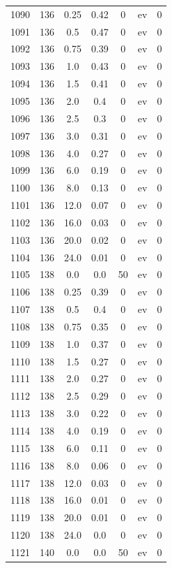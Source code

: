 \documentclass[12pt,a4paper]{article}
\begin{document}
\begin{tabular}{r|cccccc}
	1090 & 136 & 0.25 & 0.42 & 0 & ev & 0 \\
	1091 & 136 & 0.5 & 0.47 & 0 & ev & 0 \\
	1092 & 136 & 0.75 & 0.39 & 0 & ev & 0 \\
	1093 & 136 & 1.0 & 0.43 & 0 & ev & 0 \\
	1094 & 136 & 1.5 & 0.41 & 0 & ev & 0 \\
	1095 & 136 & 2.0 & 0.4 & 0 & ev & 0 \\
	1096 & 136 & 2.5 & 0.3 & 0 & ev & 0 \\
	1097 & 136 & 3.0 & 0.31 & 0 & ev & 0 \\
	1098 & 136 & 4.0 & 0.27 & 0 & ev & 0 \\
	1099 & 136 & 6.0 & 0.19 & 0 & ev & 0 \\
	1100 & 136 & 8.0 & 0.13 & 0 & ev & 0 \\
	1101 & 136 & 12.0 & 0.07 & 0 & ev & 0 \\
	1102 & 136 & 16.0 & 0.03 & 0 & ev & 0 \\
	1103 & 136 & 20.0 & 0.02 & 0 & ev & 0 \\
	1104 & 136 & 24.0 & 0.01 & 0 & ev & 0 \\
	1105 & 138 & 0.0 & 0.0 & 50 & ev & 0 \\
	1106 & 138 & 0.25 & 0.39 & 0 & ev & 0 \\
	1107 & 138 & 0.5 & 0.4 & 0 & ev & 0 \\
	1108 & 138 & 0.75 & 0.35 & 0 & ev & 0 \\
	1109 & 138 & 1.0 & 0.37 & 0 & ev & 0 \\
	1110 & 138 & 1.5 & 0.27 & 0 & ev & 0 \\
	1111 & 138 & 2.0 & 0.27 & 0 & ev & 0 \\
	1112 & 138 & 2.5 & 0.29 & 0 & ev & 0 \\
	1113 & 138 & 3.0 & 0.22 & 0 & ev & 0 \\
	1114 & 138 & 4.0 & 0.19 & 0 & ev & 0 \\
	1115 & 138 & 6.0 & 0.11 & 0 & ev & 0 \\
	1116 & 138 & 8.0 & 0.06 & 0 & ev & 0 \\
	1117 & 138 & 12.0 & 0.03 & 0 & ev & 0 \\
	1118 & 138 & 16.0 & 0.01 & 0 & ev & 0 \\
	1119 & 138 & 20.0 & 0.01 & 0 & ev & 0 \\
	1120 & 138 & 24.0 & 0.0 & 0 & ev & 0 \\
	1121 & 140 & 0.0 & 0.0 & 50 & ev & 0 \\

\end{tabular}
\end{document}
